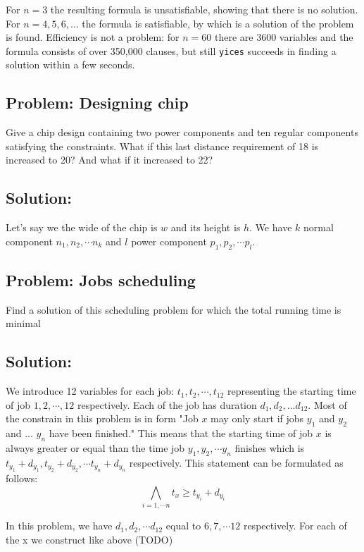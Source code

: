 \documentclass[12pt]{article}
\begin{document}
For $n=3$ the resulting formula is unsatisfiable, showing that
there is no solution. For $n = 4,5,6,\ldots$ the formula is
satisfiable, by which is a solution of the problem is found.
Efficiency is not a problem: for $n = 60$ there are 3600
variables and the formula consists of over 350,000 clauses, but 
still {\tt yices} succeeds in finding a solution within a few
seconds.

\subsection*{Problem: Designing chip}
Give a chip design containing two power components and ten
regular components satisfying the constraints. What if this last distance requirement of 18 is increased to 20? And what if it increased to 22? 

\subsection*{Solution:}
Let's say we the wide of the chip is $w$ and its height is $h$. We have $k$ normal component $n_1, n_2, \cdots n_k$ and $l$ power component $p_1, p_2, \cdots p_l$. 

\subsection*{Problem: Jobs scheduling}
Find a solution of this scheduling problem for which the total running time is minimal

\subsection*{Solution:}
We introduce 12 variables for each job: $t_1, t_2, \cdots , t_{12}$ representing the starting time of job $1, 2, \cdots, 12$ respectively. Each of the job has duration $d_1, d_2, ... d_{12}$. Most of the constrain in this problem is in form "Job $x$ may only start if jobs $y_1$ and $y_2$ and ... $y_n$ have been finished." This means that the starting time of job $x$ is always greater or equal than the time job $y_1, y_2, \cdots y_n$ finishes which is $t_{y_1}+d_{y_1}, t_{y_2}+d_{y_2}, \cdots t_{y_n}+d_{y_n}$ respectively. This statement can be formulated as follows:
\[ \bigwedge_{i=1,\cdots n} t_x \geq t_{y_i}+d_{y_i} \]

In this problem, we have $d_1, d_2, \cdots d_{12}$ equal to $6, 7, \cdots 12$ respectively. For each of the x we construct like above (TODO)
\end{document}

